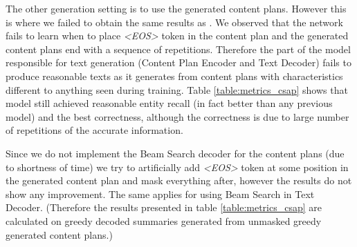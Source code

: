 The other generation setting is to use the generated content plans. However this is where we failed to obtain the same results as \citet{puduppully2019datatotext}. We observed that the network fails to learn when to place \emph{\textless EOS\textgreater} token in the content plan and the generated content plans end with a sequence of repetitions. Therefore the part of the model responsible for text generation (Content Plan Encoder and Text Decoder) fails to produce reasonable texts as it generates from content plans with characteristics different to anything seen during training. Table \ref{table:metrics_csap} shows that model still achieved reasonable entity recall (in fact better than any previous model) and the best correctness, although the correctness is due to large number of repetitions of the accurate information.

\begin{table}[h]
    \centering
    \caption{Performance metrics on the Content Selection and Planning model.} \label{table:metrics_csap}
\end{table}

Since we do not implement the Beam Search decoder for the content plans (due to shortness of time) we try to artificially add \emph{\textless EOS\textgreater} token at some position in the generated content plan and mask everything after, however the results do not show any improvement. The same applies for using Beam Search in Text Decoder. (Therefore the results presented in table \ref{table:metrics_csap} are calculated on greedy decoded summaries generated from unmasked greedy generated content plans.)


